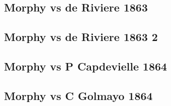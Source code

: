 \documentclass[]{book}
\begin{document}
\subsection{Morphy vs de Riviere 1863}\label{morphy-vs-de-riviere-1863}

\subsection{Morphy vs de Riviere 1863
2}\label{morphy-vs-de-riviere-1863-2}

\subsection{Morphy vs P Capdevielle
1864}\label{morphy-vs-p-capdevielle-1864}

\subsection{Morphy vs C Golmayo 1864}\label{morphy-vs-c-golmayo-1864}


\end{document}
